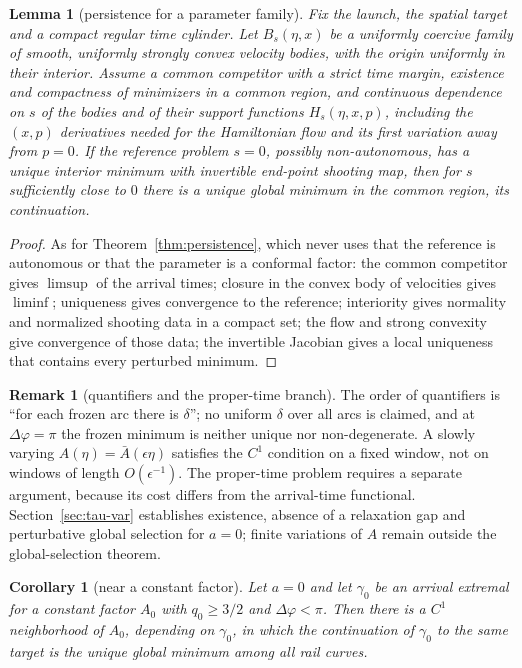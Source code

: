\documentclass[aip,jmp,amsmath,amssymb,reprint]{revtex4-2}
\theoremstyle{plain}
\newtheorem{lemma}[proposition]{Lemma}
\newtheorem{corollary}[proposition]{Corollary}
\theoremstyle{definition}
\newtheorem{remark}[proposition]{Remark}
\begin{document}
\begin{lemma}[persistence for a parameter family]\label{rmk:general-parameter}
Fix the launch, the spatial target and a compact regular time cylinder. Let $B_s(\eta,x)$ be a
uniformly coercive family of smooth, uniformly strongly convex velocity bodies, with the
origin uniformly in their interior. Assume a common competitor with a strict time margin,
existence and compactness of minimizers in a common region, and continuous dependence on $s$
of the bodies and of their support functions $H_s(\eta,x,p)$, including the $(x,p)$
derivatives needed for the Hamiltonian flow and its first variation away from $p=0$. If the
reference problem $s=0$, possibly non-autonomous, has a unique interior minimum with
invertible end-point shooting map, then for $s$ sufficiently close to $0$ there is a unique
global minimum in the common region, its continuation.
\end{lemma}

\begin{proof}
As for Theorem~\ref{thm:persistence}, which never uses that the reference is autonomous or
that the parameter is a conformal factor: the common competitor gives $\limsup$ of the
arrival times; closure in the convex body of velocities gives $\liminf$; uniqueness gives
convergence to the reference; interiority gives normality and normalized shooting data in a
compact set; the flow and strong convexity give convergence of those data; the invertible
Jacobian gives a local uniqueness that contains every perturbed minimum.
\end{proof}

\begin{remark}[quantifiers and the proper-time branch]
The order of quantifiers is ``for each frozen arc there is $\delta$''; no uniform $\delta$
over all arcs is claimed, and at $\Delta\varphi=\pi$ the frozen minimum is neither unique
nor non-degenerate. A slowly varying $A(\eta)=\bar A(\epsilon\eta)$ satisfies the $C^1$
condition on a fixed window, not on windows of length $O(\epsilon^{-1})$. The proper-time
problem requires a separate argument, because its cost differs from the arrival-time
functional. Section~\ref{sec:tau-var} establishes existence, absence of a relaxation gap and
perturbative global selection for $a=0$; finite variations of $A$ remain outside the
global-selection theorem.
\end{remark}

\begin{corollary}[near a constant factor]\label{cor:band}
Let $a=0$ and let $\gamma_0$ be an arrival extremal for a constant factor $A_0$ with
$q_0\ge3/2$ and $\Delta\varphi<\pi$. Then there is a $C^1$ neighborhood of $A_0$, depending
on $\gamma_0$, in which the continuation of $\gamma_0$ to the same target is the unique global
minimum among all rail curves.
\end{corollary}
\end{document}
